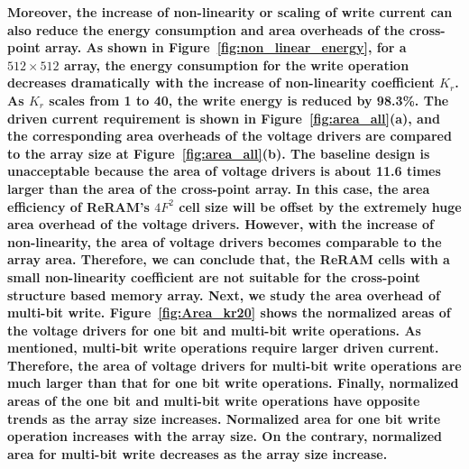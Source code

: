 \textbf{Moreover, the increase of non-linearity or scaling of write
current can also reduce the energy consumption and area overheads of the
cross-point array. As shown in Figure~\ref{fig:non_linear_energy}, for a
$512 \times 512$ array, the energy consumption for the write operation
decreases dramatically with the increase of non-linearity coefficient
$K_r$. As $K_r$ scales from 1 to 40, the write energy is reduced by
98.3\%. The driven current requirement is shown in
Figure~\ref{fig:area_all}(a), and the corresponding area overheads of the
voltage drivers are compared to the array size at
Figure~\ref{fig:area_all}(b). The baseline design is unacceptable because
the area of voltage drivers is about 11.6 times larger than the area of
the cross-point array. In this case, the area efficiency of ReRAM's $4F^2$
cell size will be offset by the extremely huge area overhead of the
voltage drivers. However, with the increase of non-linearity, the area of
voltage drivers becomes comparable to the array area. Therefore, we can
conclude that, the ReRAM cells with a small non-linearity coefficient are
not suitable for the cross-point structure based memory array. Next, we
study the area overhead of multi-bit write. Figure~\ref{fig:Area_kr20}
shows the normalized areas of the voltage drivers for one bit and
multi-bit write operations. As mentioned, multi-bit write operations
require larger driven current. Therefore, the area of voltage drivers for
multi-bit write operations are much larger than that for one bit write
operations. Finally, normalized areas of the one bit and multi-bit write
operations have opposite trends as the array size increases. Normalized
area for one bit write operation increases with the array size. On the
contrary, normalized area for multi-bit write decreases as the array size
increase.}


